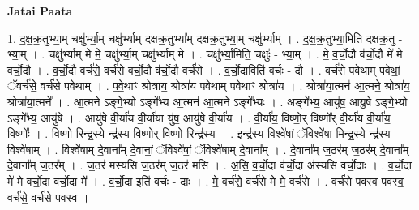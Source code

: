 \documentclass[17pt]{extarticle}
\begin{document}
\textbf{Jatai Paata} \newline

1. द॒क्ष॒क्र॒तुभ्या॒म् चक्षु॑र्भ्या॒म् चक्षु॑र्भ्याम् दक्षक्र॒तुभ्या᳚म् दक्षक्र॒तुभ्या॒म् चक्षु॑र्भ्याम् । . द॒क्ष॒क्र॒तुभ्या॒मिति॑ दक्षक्र॒तु - भ्या॒म् । . चक्षु॑र्भ्याम् मे मे॒ चक्षु॑र्भ्या॒म् चक्षु॑र्भ्याम् मे । . चक्षु॑र्भ्या॒मिति॒ चक्षुः॑ - भ्या॒म् । . मे॒ व॒र्चो॒दौ व॑र्चो॒दौ मे॑ मे वर्चो॒दौ । . व॒र्चो॒दौ वर्च॑से॒ वर्च॑से वर्चो॒दौ व॑र्चो॒दौ वर्च॑से । . व॒र्चो॒दाविति॑ वर्चः - दौ । . वर्च॑से पवेथाम् पवेथां॒ ॅवर्च॑से॒ वर्च॑से पवेथाम् । . प॒वे॒थाꣳ॒॒ श्रोत्रा॑य॒ श्रोत्रा॑य पवेथाम् पवेथाꣳ॒॒ श्रोत्रा॑य । . श्रोत्रा॑या॒त्मन॑ आ॒त्मने॒ श्रोत्रा॑य॒ श्रोत्रा॑या॒त्मने᳚ । . आ॒त्मने ऽङ्गे॒भ्यो ऽङ्गे᳚भ्य आ॒त्मन॑ आ॒त्मने ऽङ्गे᳚भ्यः । . अङ्गे᳚भ्य॒ आयु॑ष॒ आयु॒षे ऽङ्गे॒भ्यो ऽङ्गे᳚भ्य॒ आयु॑षे । . आयु॑षे वी॒र्या॑य वी॒र्या॑या यु॑ष॒ आयु॑षे वी॒र्या॑य । . वी॒र्या॑य॒ विष्णो॒र् विष्णो᳚र् वी॒र्या॑य वी॒र्या॑य॒ विष्णोः᳚ । . विष्णो॒ रिन्द्र॒स्ये न्द्र॑स्य॒ विष्णो॒र् विष्णो॒ रिन्द्र॑स्य । . इन्द्र॑स्य॒ विश्वे॑षां॒ ॅविश्वे॑षा॒ मिन्द्र॒स्ये न्द्र॑स्य॒ विश्वे॑षाम् । . विश्वे॑षाम् दे॒वाना᳚म् दे॒वानां॒ ॅविश्वे॑षां॒ ॅविश्वे॑षाम् दे॒वाना᳚म् । . दे॒वाना᳚म् ज॒ठर॑म् ज॒ठर॑म् दे॒वाना᳚म् दे॒वाना᳚म् ज॒ठर᳚म् । . ज॒ठर॑ मस्यसि ज॒ठर॑म् ज॒ठर॑ मसि । . अ॒सि॒ व॒र्चो॒दा व॑र्चो॒दा अ॑स्यसि वर्चो॒दाः । . व॒र्चो॒दा मे॑ मे वर्चो॒दा व॑र्चो॒दा मे᳚ । . व॒र्चो॒दा इति॑ वर्चः - दाः । . मे॒ वर्च॑से॒ वर्च॑से मे मे॒ वर्च॑से । . वर्च॑से पवस्व पवस्व॒ वर्च॑से॒ वर्च॑से पवस्व । \newline
\end{document}
